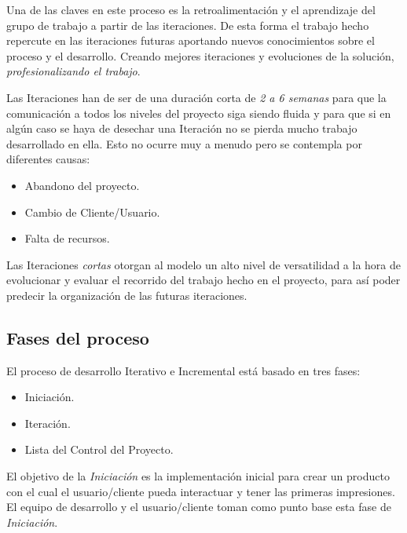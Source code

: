 \par Una de las claves en este proceso es la retroalimentación y el aprendizaje del grupo de trabajo a partir de las iteraciones. De esta forma el trabajo hecho repercute en las iteraciones futuras aportando nuevos conocimientos sobre el proceso y el desarrollo. Creando mejores iteraciones y evoluciones de la solución, \emph{profesionalizando el trabajo}.

\par Las Iteraciones han de ser de una duración corta de \emph{2 a 6 semanas} para que la comunicación a todos los niveles del proyecto siga siendo fluida y para que si en algún caso se haya de desechar una Iteración no se pierda mucho trabajo desarrollado en ella. Esto no ocurre muy a menudo pero se contempla por diferentes causas:

\begin{itemize}
	\item Abandono del proyecto.
	\item Cambio de Cliente/Usuario.
	\item Falta de recursos.
\end{itemize}

\par Las Iteraciones \emph{cortas} otorgan al modelo un alto nivel de versatilidad a la hora de evolucionar y evaluar el recorrido del trabajo hecho en el proyecto, para así poder predecir la organización de las futuras iteraciones.

\subsection{Fases del proceso}
\label{sub:fases-proceso}

\par El proceso de desarrollo Iterativo e Incremental está basado en tres fases:

\begin{itemize}
	\item Iniciación.
	\item Iteración.
	\item Lista del Control del Proyecto.
\end{itemize}

\par El objetivo de la \emph{Iniciación} es la implementación inicial para crear un producto con el cual el usuario/cliente pueda interactuar y tener las primeras impresiones. El equipo de desarrollo y el usuario/cliente toman como punto base esta fase de \emph{Iniciación}.

